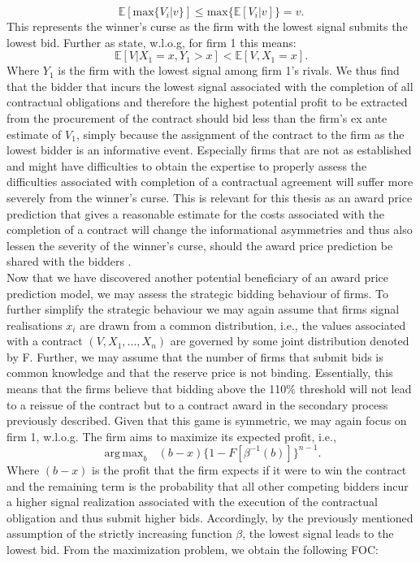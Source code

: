 \documentclass[a4paper,12pt, headsepline]{scrartcl}
\DeclareMathOperator*{\argmaxA}{arg\,max}
\numberwithin{equation}{section}
\begin{document}
\[
\mathbb{E}[\text{max}\{V_i|v\}] \leq \text{max}\{{\mathbb{E}[V_i|v]}\} = v.
\] 
This represents the winner's curse as the firm with the lowest signal submits the lowest bid. Further as \citet{milgrom82} state, w.l.o.g, for firm 1 this means:
\[
\mathbb{E}[V|X_1 = x, Y_1 > x] < \mathbb{E}[V, X_1 = x].
\]
Where $Y_1$ is the firm with the lowest signal among firm 1's rivals. We thus find that the bidder that incurs the lowest signal associated with the completion of all contractual obligations and therefore the highest potential profit to be extracted from the procurement of the contract should bid less than the firm's ex ante estimate of $V_1$, simply because the assignment of the contract to the firm as the lowest bidder is an informative event. Especially firms that are not as established and might have difficulties to obtain the expertise to properly assess the difficulties associated with completion of a contractual agreement will suffer more severely from the winner's curse. This is relevant for this thesis as an award price prediction that gives a reasonable estimate for the costs associated with the completion of a contract will change the informational asymmetries and thus also lessen the severity of the winner's curse, should the award price prediction be shared with the bidders \citep{GarciaRodriguez2020}.\\
Now that we have discovered another potential beneficiary of an award price prediction model, we may assess the strategic bidding behaviour of firms. To further simplify the strategic behaviour we may again assume that firms signal realisations $x_i$ are drawn from a common distribution, i.e., the values associated with a contract $(V, X_1, ..., X_n)$ are governed by some joint distribution denoted by F. Further, we may assume that the number of firms that submit bids is common knowledge and that the reserve price is not binding. Essentially, this means that the firms believe that bidding above the 110\% threshold will not lead to a reissue of the contract but to a contract award in the secondary process previously described. Given that this game is symmetric, we may again focus on firm 1, w.l.o.g. The firm aims to maximize its expected profit, i.e.,
\[
\argmaxA_b \text{ } (b - x)\{1 - F[\beta^{-1}(b)]\}^{n-1}.
\]
Where $(b - x)$ is the profit that the firm expects if it were to win the contract and the remaining term is the probability that all other competing bidders incur a higher signal realization associated with the execution of the contractual obligation and thus submit higher bids. Accordingly, by the previously mentioned assumption of the strictly increasing function $\beta$, the lowest signal leads to the lowest bid. From the maximization problem, we obtain the following FOC:
\end{document}
